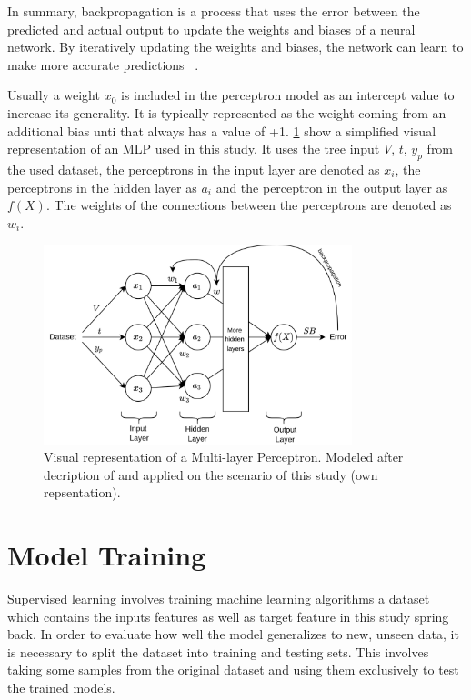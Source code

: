 In summary, backpropagation is a process that uses the error between the predicted and actual output to update the
weights and biases of a neural network.
By iteratively updating the weights and biases, the network can learn to make more accurate predictions
~\cite[p. 53--57]{nielsen2015neural}.

Usually a weight $x_0$ is included in the perceptron model as an intercept value to increase its generality.
It is typically represented as the weight coming from an additional bias unti that always has a value of +1.
\cref{fig:mlp-example} show a simplified visual representation of an MLP used in this study.
It uses the tree input $V$, $t$, $y_p$ from the used dataset, the perceptrons in the input layer are denoted as $x_i$,
the perceptrons in the hidden layer as $a_i$ and the perceptron in the output layer as $f(X)$.
The weights of the connections between the perceptrons are denoted as $w_i$.

\begin{figure}[h]
    \begin{tcolorbox}[arc=0pt,boxrule=0.5pt]
        \centering
        \includegraphics[width=0.8\textwidth]{chap4/images/mlp_example}
    \end{tcolorbox}
    \caption{Visual representation of a Multi-layer Perceptron. Modeled after decription of
    \cite{nielsen2015neural} and applied on the scenario of this study
        (own repsentation). }
    \label{fig:mlp-example}
\end{figure}


\section{Model Training}\label{sec:model-training}
Supervised learning involves training machine learning algorithms a dataset which contains the inputs features as well
as target feature in this study spring back.
In order to evaluate how well the model generalizes to new, unseen data, it is necessary to
split the dataset into training and testing sets.
This involves taking some samples from the original dataset and using them exclusively to test the trained models.

